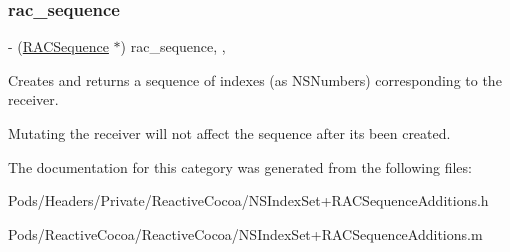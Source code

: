 \subsubsection{\texorpdfstring{rac\+\_\+sequence}{rac\_sequence}}
{\footnotesize\ttfamily -\/ (\mbox{\hyperlink{interface_r_a_c_sequence}{R\+A\+C\+Sequence}} $\ast$) rac\+\_\+sequence\hspace{0.3cm}{\ttfamily [read]}, {\ttfamily [nonatomic]}, {\ttfamily [copy]}}

Creates and returns a sequence of indexes (as {\ttfamily N\+S\+Number}s) corresponding to the receiver.

Mutating the receiver will not affect the sequence after it\textquotesingle{}s been created. 

The documentation for this category was generated from the following files\+:\begin{DoxyCompactItemize}
\item 
Pods/\+Headers/\+Private/\+Reactive\+Cocoa/N\+S\+Index\+Set+\+R\+A\+C\+Sequence\+Additions.\+h\item 
Pods/\+Reactive\+Cocoa/\+Reactive\+Cocoa/N\+S\+Index\+Set+\+R\+A\+C\+Sequence\+Additions.\+m\end{DoxyCompactItemize}
